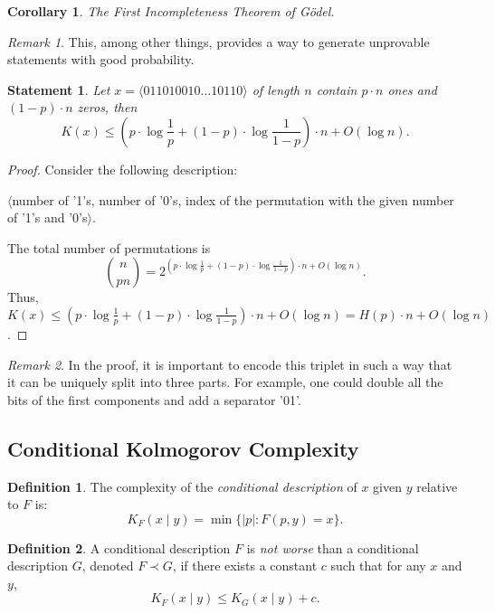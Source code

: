 \documentclass[12pt,sans]{article}
\theoremstyle{definition}
\newtheorem{definition}{Definition}[section]
\theoremstyle{plain}
\newtheorem{statement}{Statement}[section]
\newtheorem{corollary}{Corollary}[section]
\theoremstyle{remark}
\newtheorem{remark}{Remark}[section]
\begin{document}
\begin{corollary}
    The First Incompleteness Theorem of Gödel.
\end{corollary}

\begin{remark}
    This, among other things, provides a way to generate unprovable statements with good probability.
\end{remark}

\begin{statement}\label{st:kologorov:entropy}
    Let $x = \langle{011010010\dotso 10110}\rangle$ of length $n$ contain $p \cdot n$ ones and $(1-p) \cdot n$ zeros, then
    \[
    K(x) \le \left(p \cdot \log \frac{1}{p} + (1-p) \cdot \log \frac{1}{1-p}\right) \cdot n + O(\log n).
    \]
\end{statement}

\begin{proof}
    Consider the following description:
    \begin{center}
        $\langle$number of '1's, number of '0's, index of the permutation with the given number of '1's and '0's$\rangle$.
    \end{center}
    The total number of permutations is
    \[
    \binom{n}{pn} = 2^{\left(p \cdot \log \frac{1}{p} + (1-p) \cdot \log \frac{1}{1-p}\right) \cdot n + O(\log n)}.
    \]
    Thus, $K(x) \le \left(p \cdot \log \frac{1}{p} + (1-p) \cdot \log \frac{1}{1-p}\right) \cdot n + O(\log n) = H(p) \cdot n + O(\log n)$.
\end{proof}

\begin{remark}
    In the proof, it is important to encode this triplet in such a way that it can be uniquely split into three parts. For example, one could double all the bits of the first components and add a separator '01'.
\end{remark}

\subsection{Conditional Kolmogorov Complexity}
\begin{definition} The complexity of the \emph{conditional description} of $x$ given $y$ relative to $F$ is:
    \[K_F(x \mid y) = \min\{|p| : F(p,y) = x\}.\]
\end{definition}

\begin{definition} A conditional description $F$ is \emph{not worse} than a conditional description $G$, denoted $F \prec G$, if there exists a constant $c$ such that for any $x$ and $y$,
    \[
    K_F(x \mid y) \le K_G(x \mid y) + c.
    \]
\end{definition}
\end{document}
